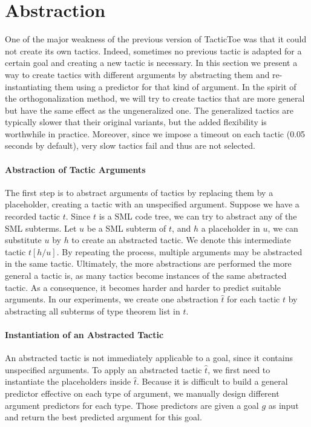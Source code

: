 \documentclass[runningheads,a4paper,draft]{svjour3}
\def\sml{\textsf{SML}\xspace}
\def\tactictoe{\textsf{TacticToe}\xspace}
\begin{document}
\section{Abstraction}\label{sec:synthesis}
One of the major weakness of the previous version of \tactictoe was that
it could not create its own tactics. Indeed, sometimes no previous tactic is
adapted for a certain goal and creating a new tactic is necessary.
In this section we present a way to create tactics with different arguments
by abstracting them and re-instantiating them using a predictor for that kind
of argument. In the spirit of the orthogonalization method, we will try to
create tactics that are more general but have the same effect as the
ungeneralized one. The generalized tactics are typically slower that their
original variants, but the added flexibility is worthwhile in practice. Moreover,
since we impose a timeout on each tactic (0.05 seconds by default), very slow
tactics fail and thus are not selected.

\paragraph{Abstraction of Tactic Arguments}
The first step is to abstract arguments of tactics by replacing them by a
placeholder, creating a tactic with an unspecified argument.
Suppose we have a recorded tactic $t$. Since $t$ is a \sml code tree, we can
try to abstract any of the
\sml subterms. Let $u$ be a \sml subterm of $t$, and $h$ a placeholder in $u$, we
can substitute $u$ by $h$ to create an abstracted tactic.
We denote this intermediate tactic $t[h/u]$. By repeating the
process, multiple
arguments may be abstracted in the same tactic. Ultimately, the more
abstractions are performed the more general a tactic is, as many tactics
become instances of the same abstracted tactic. As a consequence, it becomes
harder and harder to predict suitable arguments. In our experiments, we create
one abstraction $\hat{t}$ for each tactic $t$ by abstracting all subterms of
type theorem list in $t$.

\paragraph{Instantiation of an Abstracted Tactic}
An abstracted tactic is not immediately applicable to a goal, since it contains
unspecified arguments. To apply an abstracted tactic $\hat{t}$, we first need
to
instantiate the placeholders inside $\hat{t}$. Because it is difficult to
build a general predictor effective on each type of argument, we manually
design different argument predictors for each type. Those predictors are
given a goal $g$ as input and return the best predicted argument for this
goal.
\end{document}
